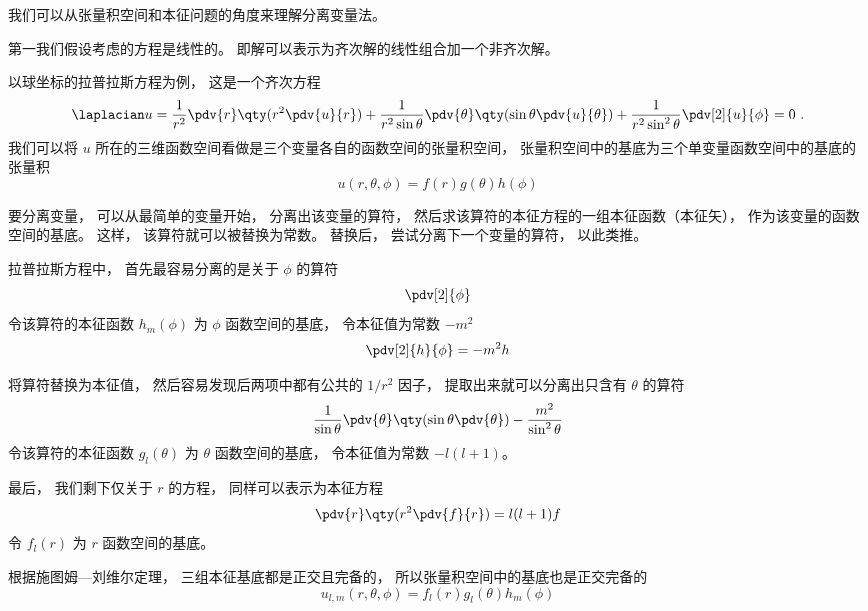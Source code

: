 

我们可以从张量积空间和本征问题的角度来理解分离变量法。

第一我们假设考虑的方程是线性的。 即解可以表示为齐次解的线性组合加一个非齐次解。

以球坐标的拉普拉斯方程为例， 这是一个齐次方程
\begin{equation}
\laplacian u = \frac{1}{r^2} \pdv{r} \qty(r^2 \pdv{u}{r}) + \frac{1}{r^2 \sin\theta}\pdv{\theta} \qty(\sin \theta \pdv{u}{\theta}) + \frac{1}{r^2 \sin^2 \theta} \pdv[2]{u}{\phi} = 0~.
\end{equation}
我们可以将 $u$ 所在的三维函数空间看做是三个变量各自的函数空间的张量积空间， 张量积空间中的基底为三个单变量函数空间中的基底的张量积
\begin{equation}
u(r, \theta, \phi) = f(r) g(\theta) h(\phi)
\end{equation}

要分离变量， 可以从最简单的变量开始， 分离出该变量的算符， 然后求该算符的本征方程的一组本征函数（本征矢）， 作为该变量的函数空间的基底。 这样， 该算符就可以被替换为常数。 替换后， 尝试分离下一个变量的算符， 以此类推。

拉普拉斯方程中， 首先最容易分离的是关于 $\phi$ 的算符
\begin{equation}
\pdv[2]{\phi}
\end{equation}
令该算符的本征函数 $h_m(\phi)$ 为 $\phi$ 函数空间的基底， 令本征值为常数 $-m^2$
\begin{equation}
\pdv[2]{h}{\phi} = -m^2 h
\end{equation}
 
将算符替换为本征值， 然后容易发现后两项中都有公共的 $1/r^2$ 因子， 提取出来就可以分离出只含有 $\theta$ 的算符
\begin{equation}
 \frac{1}{\sin\theta}\pdv{\theta} \qty(\sin \theta \pdv{\theta}) - \frac{m^2}{\sin^2 \theta}
\end{equation}
令该算符的本征函数 $g_l(\theta)$ 为 $\theta$ 函数空间的基底， 令本征值为常数 $-l(l+1)$。

最后， 我们剩下仅关于 $r$ 的方程， 同样可以表示为本征方程
\begin{equation}
\pdv{r} \qty(r^2 \pdv{f}{r}) = l(l+1) f
\end{equation}
令 $f_l(r)$ 为 $r$ 函数空间的基底。

根据施图姆—刘维尔定理， 三组本征基底都是正交且完备的， 所以张量积空间中的基底也是正交完备的
\begin{equation}
u_{l,m}(r, \theta, \phi) = f_l(r) g_l(\theta) h_m(\phi)
\end{equation}

